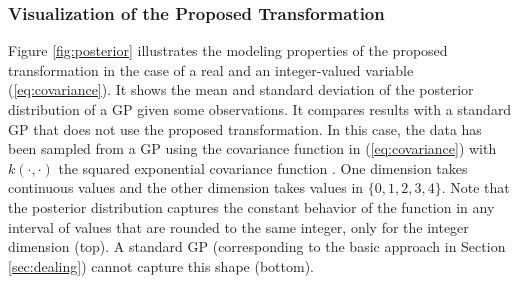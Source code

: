 \subsubsection{Visualization of the Proposed Transformation} \label{sec:visual}

Figure \ref{fig:posterior} illustrates the modeling properties of the proposed transformation in the case of a real 
and an integer-valued variable (\ref{eq:covariance}). It shows the mean and standard deviation of the posterior 
distribution of a GP given some observations. It compares results with a standard GP that does not use the proposed 
transformation. In this case, the data has been sampled from a GP using the covariance function in (\ref{eq:covariance}) 
with $k(\cdot,\cdot)$ the squared exponential covariance function \citep{rasmussen2003gaussian}. One dimension takes continuous 
values and the other dimension takes values in $\{0,1,2,3,4\}$. Note that the posterior distribution captures the constant 
behavior of the function in any interval of values that are rounded to the same integer, only for the integer 
dimension (top). A standard GP (corresponding to the basic approach in Section \ref{sec:dealing}) cannot capture 
this shape (bottom).

